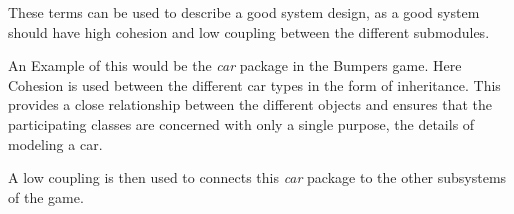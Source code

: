\documentclass[a4paper, 10pt]{article}
\begin{document}
\begin{enumerate}
        These terms can be used to describe a good system design, as a good system should have 
        high cohesion and low coupling between the different submodules.

        An Example of this would be the \textit{car} package in the Bumpers game. Here Cohesion is used between 
        the different car types in the form of inheritance. This provides a close relationship between the 
        different objects and ensures that the participating classes are concerned with only a single 
        purpose, the details of modeling a car.

        A low coupling is then used to connects this \textit{car} package to the other subsystems of the game.

\end{enumerate}
\end{document}
